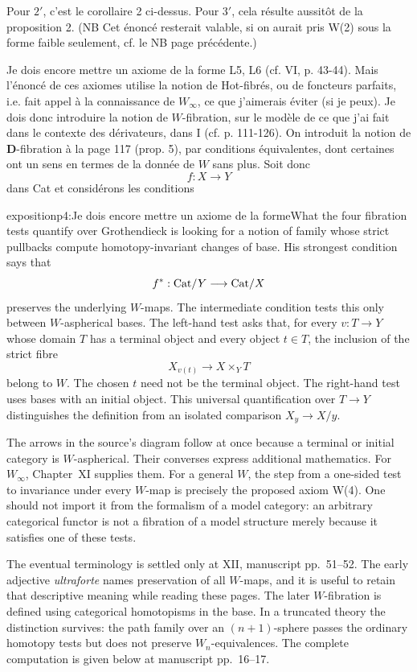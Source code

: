 Pour $2'$, c'est le corollaire 2 ci-dessus. Pour $3'$, cela résulte aussitôt de la proposition 2. (NB Cet énoncé resterait valable, si on aurait pris W(2) sous la forme faible seulement, cf. le NB page précédente.)

Je dois encore mettre un axiome de la forme L5, L6 (cf. VI, p. 43-44). Mais l'énoncé de ces axiomes utilise la notion de Hot-fibrés, ou de foncteurs parfaits, i.e. fait appel à la connaissance de $W_\infty$, ce que j'aimerais éviter (si je peux). Je dois donc introduire la notion de $W$-fibration, sur le modèle de ce que j'ai fait dans le contexte des dérivateurs, dans I (cf. p. 111-126). On introduit la notion de \textbf{D}-fibration à la page 117 (prop. 5), par conditions équivalentes, dont certaines ont un sens en termes de la donnée de $W$ sans plus. Soit donc
\[ f : X \longrightarrow Y \]
dans Cat et considérons les conditions

\begin{dcomment}{exposition}{p4:Je dois encore mettre un axiome de la forme}{What the four fibration tests quantify over}
Grothendieck is looking for a notion of family whose strict pullbacks compute homotopy-invariant changes of base. His strongest condition says that
\[
  f^*:\mathrm{Cat}/Y\longrightarrow\mathrm{Cat}/X
\]
preserves the underlying \(W\)-maps. The intermediate condition tests this only between \(W\)-aspherical bases. The left-hand test asks that, for every \(v:T\to Y\) whose domain \(T\) has a terminal object and every object \(t\in T\), the inclusion of the strict fibre
\[
   X_{v(t)}\longrightarrow X\times_Y T
\]
belong to \(W\). The chosen \(t\) need not be the terminal object. The right-hand test uses bases with an initial object. This universal quantification over \(T\to Y\) distinguishes the definition from an isolated comparison \(X_y\to X/y\).

The arrows in the source's diagram follow at once because a terminal or initial category is \(W\)-aspherical. Their converses express additional mathematics. For \(W_\infty\), Chapter~XI supplies them. For a general \(W\), the step from a one-sided test to invariance under every \(W\)-map is precisely the proposed axiom W(4). One should not import it from the formalism of a model category: an arbitrary categorical functor is not a fibration of a model structure merely because it satisfies one of these tests.

The eventual terminology is settled only at XII, manuscript pp.~51--52. The early adjective \emph{ultraforte} names preservation of all \(W\)-maps, and it is useful to retain that descriptive meaning while reading these pages. The later \(W\)-fibration is defined using categorical homotopisms in the base. In a truncated theory the distinction survives: the path family over an \((n+1)\)-sphere passes the ordinary homotopy tests but does not preserve \(W_n\)-equivalences. The complete computation is given below at manuscript pp.~16--17.
\end{dcomment}


